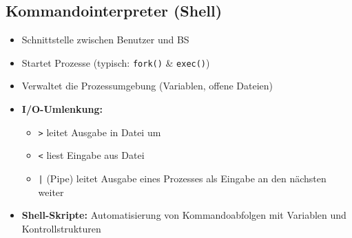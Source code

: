 \documentclass[9pt,a4paper]{extarticle}
\begin{document}
\begin{multicols*}{2}
\subsection{Kommandointerpreter (Shell)}
\begin{itemize}
\item Schnittstelle zwischen Benutzer und BS
\item Startet Prozesse (typisch: \texttt{fork()} \& \texttt{exec()})
\item Verwaltet die Prozessumgebung (Variablen, offene Dateien)
\item \textbf{I/O-Umlenkung:}
  \begin{itemize}
  \item \texttt{>} leitet Ausgabe in Datei um
  \item \texttt{<} liest Eingabe aus Datei
  \item \texttt{|} (Pipe) leitet Ausgabe eines Prozesses als Eingabe an den nächsten weiter
  \end{itemize}
\item \textbf{Shell-Skripte:} Automatisierung von Kommandoabfolgen mit Variablen und Kontrollstrukturen
\end{itemize}

\end{multicols*}
\end{document}
